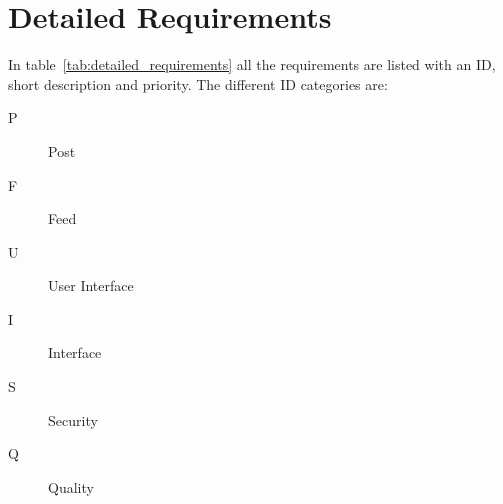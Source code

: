 \section{Detailed Requirements}
\label{sec:detailed_requirements}
In table~\ref{tab:detailed_requirements} all the requirements are listed with an ID, short description and priority. The different ID categories are:
\begin{description}
  \item[P] Post
  \item[F] Feed
  \item[U] User Interface
  \item[I] Interface
  \item[S] Security
  \item[Q] Quality
\end{description}

